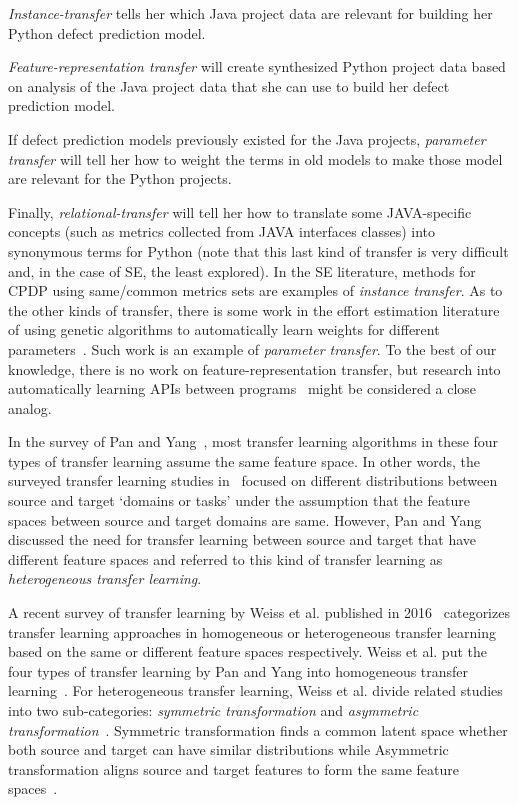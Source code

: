 \squishlist
\item
{\em Instance-transfer} tells her which Java project data are relevant
for building her Python defect prediction model.
\item
{\em Feature-representation transfer} will create synthesized Python
project data based on analysis of the Java project data that she can
use to build her defect prediction model.
\item
If defect prediction models previously existed for the Java projects,
{\em parameter transfer} will tell her how to weight the terms in old
models to make those model are relevant for the Python projects.
\item
Finally, {\em relational-transfer} will tell her how to translate some
JAVA-specific concepts (such as metrics collected from JAVA interfaces
classes) into synonymous terms for Python (note that this last kind
of transfer is very difficult and, in the case of SE, the least
explored).
\squishend
In the SE literature, methods for CPDP using same/common metrics sets are examples
of {\em instance transfer}. As to the other kinds of transfer, there is some work in the effort estimation literature of using
genetic algorithms to automatically learn weights for different parameters~\cite{sigweni2014feature}. Such work is an example of {\em parameter transfer}.
To the best of our knowledge, there is no work on feature-representation transfer, but research into automatically
learning APIs between programs~\cite{dallmeier2012automatically} might be considered a close analog.

In the survey of Pan and Yang~\cite{Pan10}, most transfer learning algorithms in these four types of transfer learning assume the same feature space.
In other words, the surveyed transfer learning studies in~\cite{Pan10} focused on different distributions between source and target `domains or tasks'
under the assumption that the feature spaces between source and target domains are same. However, Pan and Yang discussed the need for transfer learning between source and target that have different feature spaces and referred to this kind of transfer learning as {\em heterogeneous transfer learning}.

A recent survey of transfer learning by Weiss et al. published in 2016~\cite{Weiss2016} categorizes transfer learning approaches in homogeneous or heterogeneous transfer learning based on the same or different feature spaces respectively. Weiss et al. put the four types of transfer learning by Pan and Yang into homogeneous transfer learning~\cite{Weiss2016}. For heterogeneous transfer learning, Weiss et al. divide related studies into two sub-categories: {\em symmetric transformation} and {\em asymmetric transformation}~\cite{Weiss2016}. Symmetric transformation finds a common latent space whether both source and target can have similar distributions while Asymmetric transformation aligns source and target features to form the same feature spaces~\cite{Weiss2016}.

